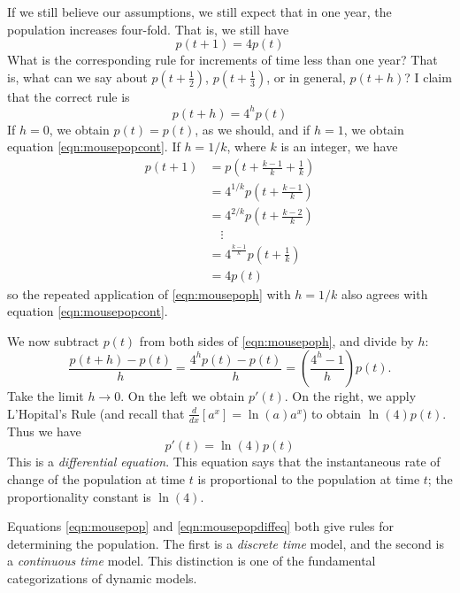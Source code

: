 If we still believe our assumptions,
we still expect that in one year, the population
increases four-fold.
That is, we still have
\begin{equation}
    p(t+1) = 4p(t)
\label{eqn:mousepopcont}
\end{equation}
What is the corresponding rule for increments of
time less than one year? That is, what can we
say about $p(t+\frac{1}{2})$, $p(t+\frac{1}{3})$,
or in general, $p(t+h)$?
I claim that the correct rule is
\begin{equation}
   p(t+h) = 4^{h}p(t)
\label{eqn:mousepoph}
\end{equation}
If $h=0$, we obtain $p(t)=p(t)$, as we should, and if
$h=1$, we obtain equation \eqref{eqn:mousepopcont}.
If $h=1/k$, where $k$ is an integer, we have
\begin{equation}
\begin{split}
   p(t+1) & = p(t+\frac{k-1}{k} + \frac{1}{k}) \\
          & = 4^{1/k}p(t+\frac{k-1}{k}) \\
	  & = 4^{2/k}p(t+\frac{k-2}{k}) \\
	  & \quad \vdots \\
	  & = 4^{\frac{k-1}{k}}p(t+\frac{1}{k}) \\
	  & = 4p(t)
\end{split}
\end{equation}
so the repeated application of \eqref{eqn:mousepoph}
with $h=1/k$ also agrees with equation \eqref{eqn:mousepopcont}.

We now subtract $p(t)$ from both sides of
\eqref{eqn:mousepoph}, and divide by $h$:
\begin{equation}
   \frac{p(t+h) - p(t)}{h} =
     \frac{4^{h} p(t) - p(t)}{h} = \left(\frac{4^h-1}{h}\right)p(t).
\end{equation}
Take the limit $h\rightarrow 0$.
On the left we obtain $p'(t)$.
On the right, we apply L'Hopital's Rule
(and recall that $\frac{d}{dx}\left[a^x\right] = \ln(a)a^x$)
to obtain $\ln(4)p(t)$.
Thus we have
\begin{equation}
   p'(t) = \ln(4)p(t)
\label{eqn:mousepopdiffeq}
\end{equation}
This is a \emph{differential equation}.
This equation says that the
instantaneous rate of change of the population
at time $t$ is proportional to the population at time $t$;
the proportionality constant is $\ln(4)$.

Equations \eqref{eqn:mousepop} and
\eqref{eqn:mousepopdiffeq} both give rules
for determining the population.
The first is a \emph{discrete time} model,
and the second is a \emph{continuous time}
model.
This distinction is one of the fundamental
categorizations of dynamic models.

